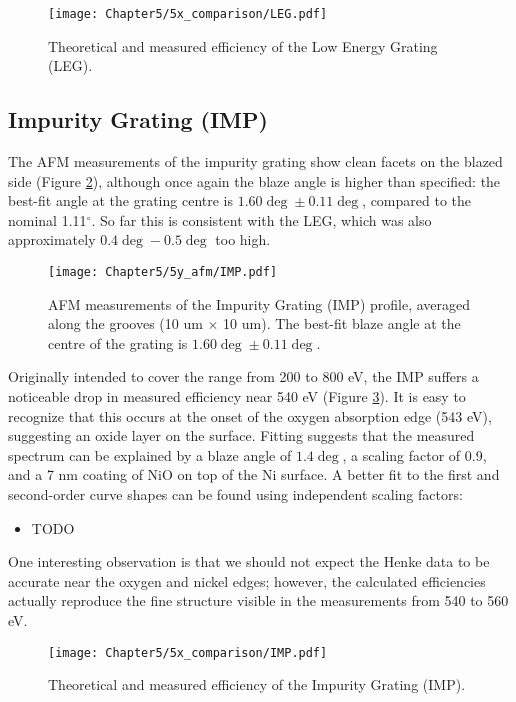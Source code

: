 \begin{figure}[htbp] %
   \centering
   \texttt{[image: Chapter5/5x\_comparison/LEG.pdf]} 
   \caption{Theoretical and measured efficiency of the Low Energy Grating (LEG).}
   \label{5x-leg}
\end{figure}

\subsection{Impurity Grating (IMP)}
The AFM measurements of the impurity grating show clean facets on the blazed side (Figure \ref{5y-imp}), although once again the blaze angle is higher than specified: the best-fit angle at the grating centre is $1.60\deg \pm 0.11\deg$, compared to the nominal 1.11$^\circ$.  So far this is consistent with the LEG, which was also approximately $0.4\deg - 0.5\deg$ too high.

\begin{figure}[htbp] %
   \centering
   \texttt{[image: Chapter5/5y\_afm/IMP.pdf]} 
   \caption{AFM measurements of the Impurity Grating (IMP) profile, averaged along the grooves (10 um $\times$ 10 um).  The best-fit blaze angle at the centre of the grating is $1.60\deg \pm 0.11\deg$.}
   \label{5y-imp}
\end{figure}

Originally intended to cover the range from 200 to 800 eV, the IMP suffers a noticeable drop in measured efficiency near 540 eV (Figure \ref{5x-imp}).  It is easy to recognize that this occurs at the onset of the oxygen absorption edge (543 eV), suggesting an oxide layer on the surface.  Fitting suggests that the measured spectrum can be explained by a blaze angle of $1.4\deg$, a scaling factor of 0.9, and a 7 nm coating of NiO on top of the Ni surface.  A better fit to the first and second-order curve shapes can be found using independent scaling factors:
\begin{itemize}
\item TODO
\end{itemize}
One interesting observation is that we should not expect the Henke data to be accurate near the oxygen and nickel edges; however, the calculated efficiencies actually reproduce the fine structure visible in the measurements from 540 to 560 eV.

\begin{figure}[htbp] %
   \centering
   \texttt{[image: Chapter5/5x\_comparison/IMP.pdf]} 
   \caption{Theoretical and measured efficiency of the Impurity Grating (IMP).}
   \label{5x-imp}
\end{figure}

